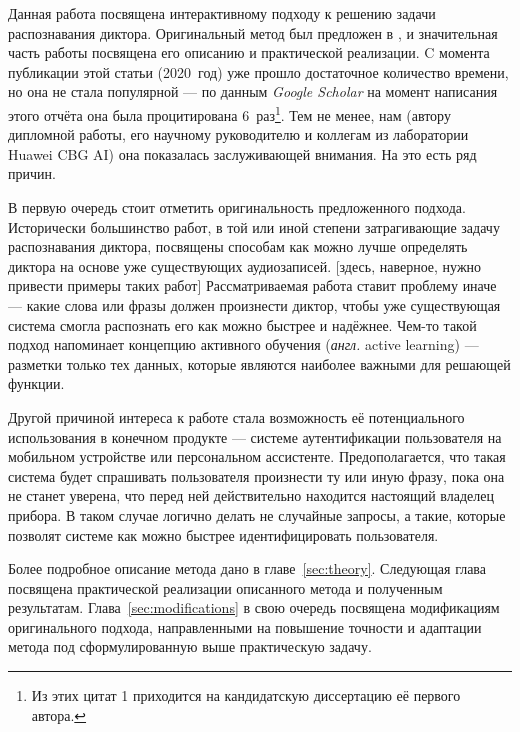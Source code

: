 Данная работа посвящена интерактивному подходу к решению задачи распознавания
диктора.  Оригинальный метод был предложен в \citeisr, и значительная часть
работы посвящена его описанию и практической реализации. C момента публикации
этой статьи (2020~год) уже прошло достаточное количество времени, но она не
стала популярной --- по данным \textit{Google Scholar} на момент написания
этого отчёта она была процитирована 6~раз\footnote{
    Из этих цитат 1 приходится на кандидатскую диссертацию её первого автора.
}.
Тем не менее, нам (автору дипломной работы, его научному руководителю и коллегам
из лаборатории Huawei CBG AI) она показалась заслуживающей внимания. На это есть
ряд причин.

В первую очередь стоит отметить оригинальность предложенного подхода.
Исторически большинство работ, в той или иной степени затрагивающие задачу
распознавания диктора, посвящены способам как можно лучше определять диктора
на основе уже существующих аудиозаписей. [здесь, наверное, нужно привести
примеры таких работ] Рассматриваемая работа ставит проблему иначе --- какие
слова или фразы должен произнести диктор, чтобы уже существующая система
смогла распознать его как можно быстрее и надёжнее. Чем-то такой подход
напоминает концепцию активного обучения (\textit{англ.} active learning) ---
разметки только тех данных, которые являются наиболее важными для решающей
функции.

Другой причиной интереса к работе стала возможность её потенциального использования
в конечном продукте --- системе аутентификации пользователя на мобильном устройстве
или персональном ассистенте. Предополагается, что такая система будет спрашивать
пользователя произнести ту или иную фразу, пока она не станет уверена, что перед
ней действительно находится настоящий владелец прибора. В таком случае логично
делать не случайные запросы, а такие, которые позволят системе как можно быстрее
идентифицировать пользователя. 

Более подробное описание метода дано в главе~\ref{sec:theory}. Следующая глава
посвящена практической реализации описанного метода и полученным результатам.
Глава~\ref{sec:modifications} в свою очередь посвящена модификациям
оригинального подхода, направленными на повышение точности и адаптации метода
под сформулированную выше практическую задачу.